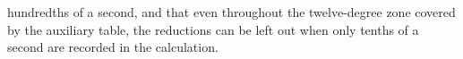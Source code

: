 %
hundredths of a second, and that even throughout the twelve-degree zone covered by the auxiliary table, the reductions can be left out when only tenths of a second are recorded in the calculation.

